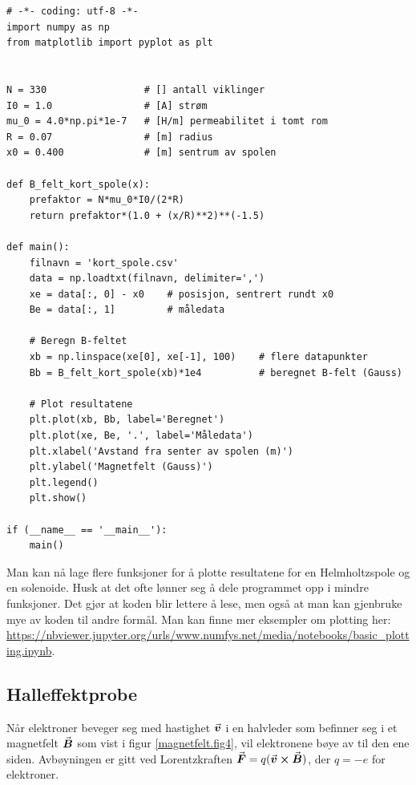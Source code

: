\documentclass[../Elmag-labhefte-2020.tex]{subfiles}
\begin{document}
\begin{verbatim}
# -*- coding: utf-8 -*-
import numpy as np
from matplotlib import pyplot as plt


N = 330                 # [] antall viklinger
I0 = 1.0                # [A] strøm 
mu_0 = 4.0*np.pi*1e-7   # [H/m] permeabilitet i tomt rom
R = 0.07                # [m] radius
x0 = 0.400              # [m] sentrum av spolen

def B_felt_kort_spole(x):
    prefaktor = N*mu_0*I0/(2*R)
    return prefaktor*(1.0 + (x/R)**2)**(-1.5)
    
def main():
    filnavn = 'kort_spole.csv'
    data = np.loadtxt(filnavn, delimiter=',')
    xe = data[:, 0] - x0    # posisjon, sentrert rundt x0
    Be = data[:, 1]         # måledata 
    
    # Beregn B-feltet
    xb = np.linspace(xe[0], xe[-1], 100)    # flere datapunkter
    Bb = B_felt_kort_spole(xb)*1e4          # beregnet B-felt (Gauss)
    
    # Plot resultatene
    plt.plot(xb, Bb, label='Beregnet')
    plt.plot(xe, Be, '.', label='Måledata')
    plt.xlabel('Avstand fra senter av spolen (m)')
    plt.ylabel('Magnetfelt (Gauss)')
    plt.legend()
    plt.show()
    
if (__name__ == '__main__'):
    main()
\end{verbatim}

Man kan nå lage flere funksjoner for å plotte resultatene for en Helmholtzspole og en solenoide. Husk at det ofte lønner seg å dele programmet opp i mindre funksjoner. Det gjør at koden blir lettere å lese, men også at man kan gjenbruke mye av koden til andre formål. Man kan finne mer eksempler om plotting her: \url{https://nbviewer.jupyter.org/urls/www.numfys.net/media/notebooks/basic_plotting.ipynb}. 

\subsection{Halleffektprobe}

Når elektroner beveger seg med hastighet $\va*{v}$ i en halvleder som befinner seg i et magnetfelt $\va*{B}$ som vist i figur \ref{magnetfelt.fig4}, vil elektronene bøye av til den ene siden. Avbøyningen er gitt ved Lorentzkraften $\va*{F} = q(\va*{v} \cross \va*{B})$, der $q = -e$ for elektroner.  
\end{document}
